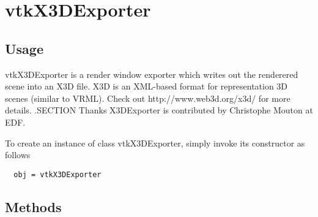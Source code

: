 \section{vtkX3DExporter}

\subsection{Usage}

 vtkX3DExporter is a render window exporter which writes out the renderered
 scene into an X3D file. X3D is an XML-based format for representation 
 3D scenes (similar to VRML). Check out http://www.web3d.org/x3d/ for more
 details.
 .SECTION Thanks
 X3DExporter is contributed by Christophe Mouton at EDF.

To create an instance of class vtkX3DExporter, simply
invoke its constructor as follows
\begin{verbatim}
  obj = vtkX3DExporter
\end{verbatim}
\subsection{Methods}

